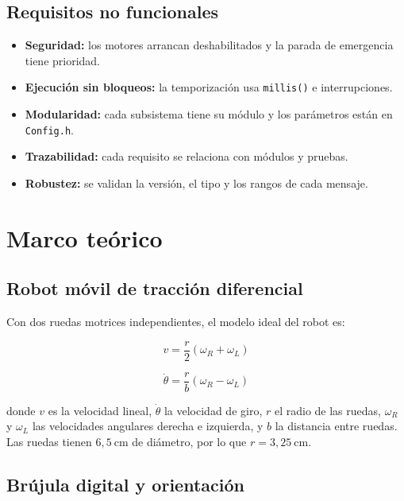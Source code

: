 \documentclass[journal]{IEEEtran}
\begin{document}
\subsection{Requisitos no funcionales}

\begin{itemize}
    \item \textbf{Seguridad:} los motores arrancan deshabilitados y la parada de emergencia tiene prioridad.
    \item \textbf{Ejecución sin bloqueos:} la temporización usa \texttt{millis()} e interrupciones.
    \item \textbf{Modularidad:} cada subsistema tiene su módulo y los parámetros están en \texttt{Config.h}.
    \item \textbf{Trazabilidad:} cada requisito se relaciona con módulos y pruebas.
    \item \textbf{Robustez:} se validan la versión, el tipo y los rangos de cada mensaje.
\end{itemize}

\section{Marco teórico}

\subsection{Robot móvil de tracción diferencial}

Con dos ruedas motrices independientes, el modelo ideal del robot \cite{Siegwart} es:

\begin{equation}
v = \frac{r}{2}(\omega_R+\omega_L)
\label{eq:velocidad_lineal}
\end{equation}

\begin{equation}
\dot{\theta} = \frac{r}{b}(\omega_R-\omega_L)
\label{eq:velocidad_angular}
\end{equation}

donde $v$ es la velocidad lineal, $\dot{\theta}$ la velocidad de giro, $r$ el radio de las ruedas, $\omega_R$ y $\omega_L$ las velocidades angulares derecha e izquierda, y $b$ la distancia entre ruedas. Las ruedas tienen $6{,}5~\mathrm{cm}$ de diámetro, por lo que $r=3{,}25~\mathrm{cm}$.

\subsection{Brújula digital y orientación}
\end{document}
